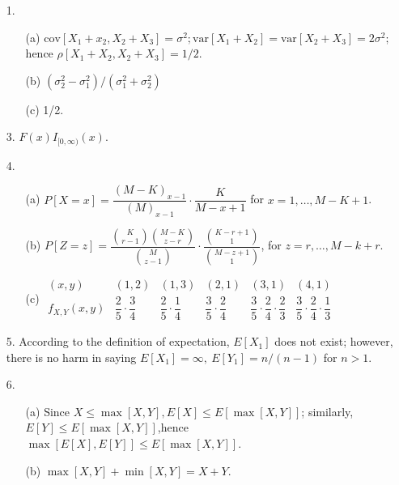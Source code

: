 \begin{enumerate}
	\item[1.] \begin{itemize}
		\item[(a)] $\mbox{cov}[X_1+x_2, X_2+X_3]=\sigma^2; \mbox{var}[X_1+X_2]=\mbox{var}[X_2+X_3]=2\sigma^2;$ \\
		hence $\rho[X_1+X_2, X_2+X_3] = 1/2$.
		\item[(b)] $(\sigma_2^2-\sigma_1^2)/(\sigma_1^2+\sigma_2^2)$ 
		\item[(c)] 1/2.
	\end{itemize}

	\item[3.] $F(x)I_{[0,\infty)}(x)$.
	
	\item[4.] \begin{enumerate}
		\item[(a)] $P[X=x] = \dfrac{(M-K)_{x-1}}{(M)_{x-1}} \cdot \dfrac{K}{M-x+1}$ for $x=1,\ldots, M-K+1$.
		\item[(b)] $P[Z=z] = \dfrac{\displaystyle {K\choose r-1}{M-K\choose z-r}}{\displaystyle{M\choose z-1}} \cdot \dfrac{\displaystyle {K-r+1\choose 1}}{\displaystyle{M-z+1\choose 1}}$, for $z=r,\ldots, M-k+r.$ 
		\item[(c)] $\begin{array}{c||c|c|c|c|c}
			(x,y) & (1,2) & (1,3) & (2,1) & (3,1) & (4,1) \\ \hline
			f_{X,Y}(x,y) & \dfrac{2}{5}\cdot\dfrac{3}{4} & \dfrac{2}{5}\cdot\dfrac{1}{4} & \dfrac{3}{5}\cdot\dfrac{2}{4} & \dfrac{3}{5}\cdot\dfrac{2}{4}\cdot\dfrac{2}{3} & \dfrac{3}{5}\cdot\dfrac{2}{4}\cdot\dfrac{1}{3}
		\end{array}$
	\end{enumerate}

	\item[5.] According to the definition of expectation, $E[X_1]$ does not exist; however, there is no harm in saying $E[X_1]=\infty,\ E[Y_1] = n/(n-1)$ for $n>1$.

	\item[6.] \begin{enumerate}
		\item[(a)] Since $X\le \max[X,Y], E[X]\le E[\max[X,Y]]$; similarly, \\
			$E[Y]\le E[\max[X,Y]]$,hence $\max[E[X],E[Y]]\le E[\max[X,Y]]$.
		\item[(b)] $\max[X,Y]+\min[X,Y] = X + Y$. 
	\end{enumerate}


\end{enumerate}
